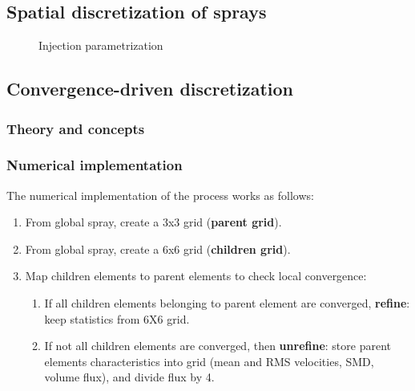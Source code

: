 \subsection{Spatial discretization of sprays}
\label{subsec:SLI_spatial_discretization}

\begin{figure}[h!]	
	\centering
	\caption{Injection parametrization}
	\label{fig:SLI_injection}
\end{figure}

\subsection{Convergence-driven discretization}
\label{subsec:SLI_quadtrees_discretization}

\subsubsection{Theory and concepts}

\subsubsection{Numerical implementation}

The numerical implementation of the process works as follows:

\begin{enumerate}

	\item From global spray, create a 3x3 grid (\textbf{parent grid}).
	
	\item From global spray, create a 6x6 grid (\textbf{children grid}).
	
	\item Map children elements to parent elements to check local convergence:
	
	\begin{enumerate}
	
		\item If all children elements belonging to parent element are converged, \textbf{refine}: keep statistics from 6X6 grid.
		
		\item If not all children elements are converged, then \textbf{unrefine}: store parent elements characteristics into grid (mean and RMS velocities, SMD, volume flux),  and divide flux by 4.
	
	\end{enumerate}

\end{enumerate}


